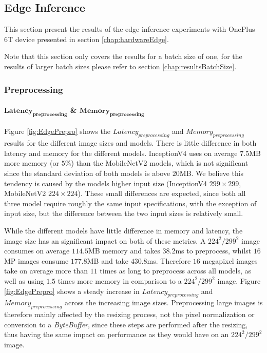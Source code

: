 \subsection{Edge Inference}
This section present the results of the edge inference experiments with OnePlus 6T device presented in section \ref{chap:hardwareEdge}.

Note that this section only covers the results for a batch size of one, for the results of larger batch sizes please refer to section \ref{chap:resultsBatchSize}.

\FloatBarrier
\subsubsection{Preprocessing}
\label{chap:edgePrepro}

\paragraph{$\mathbf{Latency_{preprocessing}}$ \& $\mathbf{Memory_{preprocessing}}$}
Figure \ref{fig:EdgePrepro} shows the $Latency_{preprocessing}$ and $Memory_{preprocessing}$ results for the different image sizes and models.
There is little difference in both latency and memory for the different models. 
InceptionV4 uses on average $7.5$MB more memory (or $5\%$) than the MobileNetV2 models, which is not significant since the standard deviation of both models is above $20$MB.
We believe this tendency is caused by the models higher input size (InceptionV4 $299\times299$, MobileNetV2 $224\times224$). 
These small differences are expected, since both all three model require roughly the same input specifications, with the exception of input size, but the difference between the two input sizes is relatively small.

While the different models have little difference in memory and latency, the image size has an significant impact on both of these metrics.
A $224^2/299^2$ image consumes on average $114.5$MB memory and takes $38.2$ms to preprocess, whilst  $16$MP images consume $177.8$MB and take $430.8$ms.
Therefore $16$ megapixel images take on average  more than $11$ times as long to preprocess across all models, as well as using $1.5$ times more memory in comparison to a $224^2/299^2$ image.
Figure \ref{fig:EdgePrepro} shows a steady increase in $Latency_{preprocessing}$ and $Memory_{preprocessing}$ across the increasing image sizes.
Preprocessing large images is therefore mainly affected by the resizing process, not the pixel normalization or conversion to a \emph{ByteBuffer}, since these steps are performed after the resizing, thus having the same impact on performance as they would have on an $224^2/299^2$ image.

